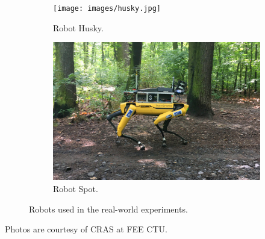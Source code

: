         \begin{figure}[H]
            \centering
            \begin{subfigure}[b]{0.45\textwidth}
                \centering
                \texttt{[image: images/husky.jpg]}
                \caption{Robot Husky.}
                \label{fig:husky}
            \end{subfigure}
            \begin{subfigure}[b]{0.45\textwidth}
                \centering
                \includegraphics[width=\textwidth]{images/spot3.jpg}
                \caption{Robot Spot.}
                \label{fig:spot}
            \end{subfigure}
            \caption{Robots used in the real-world experiments.}
        \end{figure}
        \noindent Photos are courtesy of CRAS at FEE CTU.

